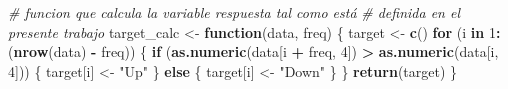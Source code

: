 \documentclass[]{DissertateUSU}
\newenvironment{Shaded}{\begin{snugshade}}{\end{snugshade}}
\newcommand{\CommentTok}[1]{\textcolor[rgb]{0.56,0.35,0.01}{\textit{#1}}}
\newcommand{\ControlFlowTok}[1]{\textcolor[rgb]{0.13,0.29,0.53}{\textbf{#1}}}
\newcommand{\DecValTok}[1]{\textcolor[rgb]{0.00,0.00,0.81}{#1}}
\newcommand{\KeywordTok}[1]{\textcolor[rgb]{0.13,0.29,0.53}{\textbf{#1}}}
\newcommand{\NormalTok}[1]{#1}
\newcommand{\OperatorTok}[1]{\textcolor[rgb]{0.81,0.36,0.00}{\textbf{#1}}}
\newcommand{\StringTok}[1]{\textcolor[rgb]{0.31,0.60,0.02}{#1}}
\begin{document}
\setlength\parskip{5ex}

\scriptsize

\begin{Shaded}
\begin{Highlighting}[]
\CommentTok{# funcion que calcula la variable respuesta tal como está}
\CommentTok{# definida en el presente trabajo}
\NormalTok{target_calc <-}\StringTok{ }\ControlFlowTok{function}\NormalTok{(data, freq) \{}
\NormalTok{    target <-}\StringTok{ }\KeywordTok{c}\NormalTok{()}
    \ControlFlowTok{for}\NormalTok{ (i }\ControlFlowTok{in} \DecValTok{1}\OperatorTok{:}\NormalTok{(}\KeywordTok{nrow}\NormalTok{(data) }\OperatorTok{-}\StringTok{ }\NormalTok{freq)) \{}
        \ControlFlowTok{if}\NormalTok{ (}\KeywordTok{as.numeric}\NormalTok{(data[i }\OperatorTok{+}\StringTok{ }\NormalTok{freq, }\DecValTok{4}\NormalTok{]) }\OperatorTok{>}\StringTok{ }\KeywordTok{as.numeric}\NormalTok{(data[i, }
            \DecValTok{4}\NormalTok{])) \{}
\NormalTok{            target[i] <-}\StringTok{ "Up"}
\NormalTok{        \} }\ControlFlowTok{else}\NormalTok{ \{}
\NormalTok{            target[i] <-}\StringTok{ "Down"}
\NormalTok{        \}}
\NormalTok{    \}}
    \KeywordTok{return}\NormalTok{(target)}
\NormalTok{\}}


\end{Highlighting}
\end{Shaded}
\end{document}
